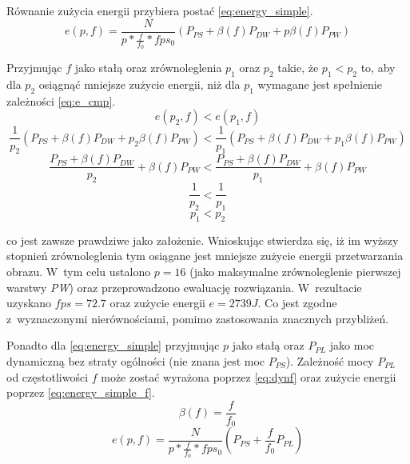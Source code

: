 Równanie zużycia energii przybiera postać \eqref{eq:energy_simple}.
\begin{equation}
e(p,f) = \frac{N}{p*\frac{f}{f_0}* fps_0}(P_{PS} + \beta (f) P_{DW} + p \beta (f) P_{PW})
\label{eq:energy_simple}
\end{equation}


Przyjmując $f$ jako stałą oraz zrównoleglenia $p_1$ oraz $p_2$ takie, że $p_1 < p_2$ 
to, aby dla $p_2$ osiągnąć mniejsze zużycie energii, niż dla $p_1$ wymagane jest spełnienie zależności \eqref{eq:e_cmp}.
\begin{equation}
e(p_2, f) < e(p_1, f)
\label{eq:e_cmp}
\end{equation}
\begin{equation}
\frac{1}{p_2}(P_{PS} + \beta(f) P_{DW} + p_2 \beta(f) P_{PW}) < 
\frac{1}{p_1}(P_{PS} + \beta(f) P_{DW} + p_1 \beta(f) P_{PW})
\end{equation}
\begin{equation}
\frac{P_{PS} + \beta(f) P_{DW}}{p_2} + \beta(f) P_{PW} < 
\frac{P_{PS} + \beta(f) P_{DW}}{p_1} + \beta(f) P_{PW}
\end{equation}
\begin{equation}
\frac{1}{p_2} < \frac{1}{p_1}
\end{equation}
\begin{equation}
p_1 < p_2
\end{equation}

 co jest zawsze prawdziwe jako założenie. 
 Wnioskując stwierdza się, iż im wyższy stopnień zrównoleglenia tym osiągane jest mniejsze zużycie energii przetwarzania obrazu.
 W~tym celu ustalono $p = 16$ (jako maksymalne zrównoleglenie pierwszej warstwy \emph{PW}) oraz przeprowadzono ewaluację rozwiązania.
 W~rezultacie uzyskano $fps = 72.7$ oraz zużycie energii $e = 2739 J$.
 Co jest zgodne z~wyznaczonymi nierównościami, pomimo zastosowania znacznych przybliżeń.
 
Ponadto dla \eqref{eq:energy_simple} przyjmując $p$ jako stałą oraz  $P_{PL}$ jako moc dynamiczną bez straty ogólności (nie znana jest moc $P_{PS}$).
Zależność mocy $P_{PL}$ od częstotliwości $f$ może zostać wyrażona poprzez \eqref{eq:dynf} \cite{dynamic_power} oraz zużycie energii poprzez \eqref{eq:energy_simple_f}. 
\begin{equation}
\beta(f) = \frac{f}{f_0}
\label{eq:dynf}
\end{equation} 
\begin{equation}
e(p,f) = \frac{N}{p*\frac{f}{f_0}* fps_0}(P_{PS} + \frac{f}{f_0} P_{PL})
\label{eq:energy_simple_f}
\end{equation}

